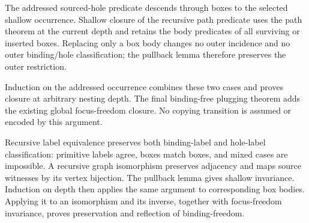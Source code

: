 







The addressed sourced-hole predicate descends through boxes to the
selected shallow occurrence. Shallow closure of the recursive path predicate
uses the path theorem at the current depth and retains the body predicates
of all surviving or inserted boxes. Replacing only a box body changes no
outer incidence and no outer binding/hole classification; the pullback
lemma therefore preserves the outer restriction.

Induction on the addressed occurrence combines these two cases and proves
closure at arbitrary nesting depth. The final binding-free plugging theorem
adds the existing global focus-freedom closure. No copying transition is
assumed or encoded by this argument.











Recursive label equivalence preserves both binding-label and hole-label
classification: primitive labels agree, boxes match boxes, and mixed cases
are impossible. A recursive graph isomorphism preserves adjacency and maps
source witnesses by its vertex bijection. The pullback lemma gives shallow
invariance. Induction on depth then applies the same argument to corresponding
box bodies. Applying it to an isomorphism and its inverse, together with
focus-freedom invariance, proves preservation and reflection of binding-freedom.








